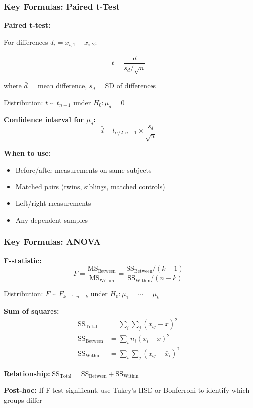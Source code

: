 \documentclass{beamer}
\begin{document}
\begin{frame}
\frametitle{Key Formulas: Paired t-Test}
\textbf{Paired t-test:}

For differences $d_i = x_{i,1} - x_{i,2}$:

$$t = \frac{\bar{d}}{s_d/\sqrt{n}}$$

where $\bar{d}$ = mean difference, $s_d$ = SD of differences

Distribution: $t \sim t_{n-1}$ under $H_0: \mu_d = 0$

\vspace{0.3cm}
\textbf{Confidence interval for $\mu_d$:}
$$\bar{d} \pm t_{\alpha/2, n-1} \times \frac{s_d}{\sqrt{n}}$$

\vspace{0.3cm}
\textbf{When to use:}
\begin{itemize}
\item Before/after measurements on same subjects
\item Matched pairs (twins, siblings, matched controls)
\item Left/right measurements
\item Any dependent samples
\end{itemize}
\end{frame}

\begin{frame}
\frametitle{Key Formulas: ANOVA}
\textbf{F-statistic:}
$$F = \frac{\text{MS}_{\text{Between}}}{\text{MS}_{\text{Within}}} = \frac{\text{SS}_{\text{Between}}/(k-1)}{\text{SS}_{\text{Within}}/(n-k)}$$

Distribution: $F \sim F_{k-1, n-k}$ under $H_0: \mu_1 = \cdots = \mu_k$

\vspace{0.3cm}
\textbf{Sum of squares:}
\begin{align*}
\text{SS}_{\text{Total}} &= \sum_i\sum_j (x_{ij} - \bar{x})^2\\
\text{SS}_{\text{Between}} &= \sum_i n_i(\bar{x}_i - \bar{x})^2\\
\text{SS}_{\text{Within}} &= \sum_i\sum_j (x_{ij} - \bar{x}_i)^2
\end{align*}

\vspace{0.3cm}
\textbf{Relationship:} $\text{SS}_{\text{Total}} = \text{SS}_{\text{Between}} + \text{SS}_{\text{Within}}$

\vspace{0.3cm}
\textbf{Post-hoc:} If F-test significant, use Tukey's HSD or Bonferroni to identify which groups differ
\end{frame}
\end{document}
